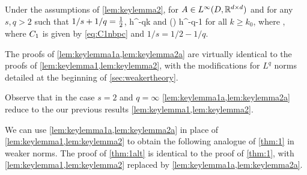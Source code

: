 \label{lem:keylemma2a}
Under the assumptions of \cref{lem:keylemma2}, for $A\in L^\infty(D,\mathbb R^{d\times d})$ and for any $s,q > 2$ such that $1/s + 1/q = \frac{1}{2}$,
\beq\label{eq:keybound22}
\max\set{\NDk{\AmatoI \SmatA},\NDkI{\SmatA\AmatoI}} \leq \Cotilde h^{-q}k 
\eeq
and
\beq\label{eq:keybound2a2}
\max\set{\Nt{\AmatoI \SmatA},\Nt{\SmatA\AmatoI}} \leq \Cotilde\mleft(\frac{\splus}{\mminus}\mright) h^{-q-1} 
\eeq
for all $k\geq k_0$, where
\beq\label{eq:C1tildenbpc}
\Cotilde \de \Cinvs\Co,
\eeq
where $C_{1}$ is given by \cref{eq:C1nbpc} and $1/s = 1/2 - 1/q.$
\ele

The proofs of \cref{lem:keylemma1a,lem:keylemma2a} are virtually identical to the proofs of \cref{lem:keylemma1,lem:keylemma2}, with the modifications for $L^q$ norms detailed at the beginning of \cref{sec:weakertheory}.

Observe that in the case $s=2$ and $q=\infty$ \cref{lem:keylemma1a,lem:keylemma2a} reduce to the our previous results \cref{lem:keylemma1,lem:keylemma2}.
\ere

We can use \cref{lem:keylemma1a,lem:keylemma2a} in place of \cref{lem:keylemma1,lem:keylemma2} to obtain the following analogue of \cref{thm:1} in weaker norms. The proof of \cref{thm:1alt} is identical to the proof of \cref{thm:1}, with \cref{lem:keylemma1,lem:keylemma2} replaced by \cref{lem:keylemma1a,lem:keylemma2a}.

